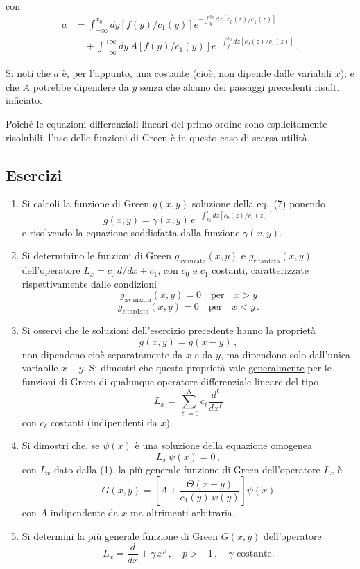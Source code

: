 \documentclass[11pt, a4paper]{book}
\numberwithin{equation}{section}
\newenvironment{esercizi}{\subsection*{Esercizi}\begin{enumerate}}{\end{enumerate}}
\begin{document}
con
\begin{align*}
a &= \int_{-\infty}^{x_0} dy \left[ f(y)/c_1(y) \right]
     e^{\displaystyle -\int_{y}^{x_0} dz \left[ c_0(z)/c_1(z) \right]} \\
  &\quad + \int_{-\infty}^{+\infty} dy \, A \left[ f(y)/c_1(y) \right]
     e^{\displaystyle -\int_{y}^{x_0} dz \left[ c_0(z)/c_1(z) \right]} \,.
\end{align*}

Si noti che $a$ è, per l'appunto, una costante (cioè, non dipende dalle variabili $x$); e che $A$ potrebbe dipendere da $y$ senza che alcuno dei passaggi precedenti risulti inficiato.

Poiché le equazioni differenziali lineari del primo ordine sono esplicitamente risolubili, l'uso delle funzioni di Green è in questo caso di scarsa utilità.

\begin{esercizi}

\item Si calcoli la funzione di Green $g(x,y)$ soluzione della eq.~(7) ponendo
\[
    g(x,y) = \gamma(x,y) \, e^{\displaystyle -\int_{x_0}^{x} dz \left[ c_0(z)/c_1(z) \right]}
\]
e risolvendo la equazione soddisfatta dalla funzione $\gamma(x,y)$.

\item Si determinino le funzioni di Green $g_{\text{avanzata}}(x,y)$ e $g_{\text{ritardata}}(x,y)$ dell'operatore $L_x = c_0 \, d/dx + c_1$, con $c_0$ e $c_1$ costanti, caratterizzate rispettivamente dalle condizioni
\[
    g_{\text{avanzata}}(x,y) = 0 \quad \text{per} \quad x > y
\]
\[
    g_{\text{ritardata}}(x,y) = 0 \quad \text{per} \quad x < y \,.
\]

\item Si osservi che le soluzioni dell'esercizio precedente hanno la proprietà
\[
    g(x,y) = g(x-y) \,,
\]
non dipendono cioè separatamente da $x$ e da $y$, ma dipendono solo dall'unica variabile $x-y$. Si dimostri che questa proprietà vale \uline{generalmente} per le funzioni di Green di qualunque operatore differenziale lineare del tipo
\[
    L_x = \sum_{\ell=0}^{N} c_\ell \frac{d^\ell}{dx^\ell}
\]
con $c_\ell$ costanti (indipendenti da $x$).

\item Si dimostri che, se $\psi(x)$ è una soluzione della equazione omogenea
\[
    L_x \, \psi(x) = 0 \,,
\]
con $L_x$ dato dalla (1), la più generale funzione di Green dell'operatore $L_x$ è
\[
    G(x,y) = \left[ A + \frac{\Theta(x-y)}{c_1(y)\,\psi(y)} \right] \psi(x)
\]
con $A$ indipendente da $x$ ma altrimenti arbitraria.

\item Si determini la più generale funzione di Green $G(x,y)$ dell'operatore
\[
    L_x = \frac{d}{dx} + \gamma \, x^p \,, \quad p > -1 \,, \quad \gamma \text{ costante.}
\]

\end{esercizi}
\end{document}
